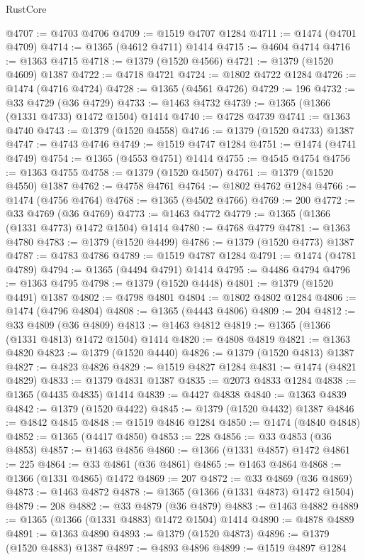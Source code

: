 \begin{lexlean}{RustCore}
\begin{coremodule}
@4707 := @4703 @4706
@4709 := @1519 @4707 @1284
@4711 := @1474 (@4701 @4709)
@4714 := @1365 (@4612 @4711) @1414
@4715 := @4604 @4714
@4716 := @1363 @4715
@4718 := @1379 (@1520 @4566)
@4721 := @1379 (@1520 @4609) @1387
@4722 := @4718 @4721
@4724 := @1802 @4722 @1284
@4726 := @1474 (@4716 @4724)
@4728 := @1365 (@4561 @4726)
@4729 := 196
@4732 := @33 @4729 (@36 @4729)
@4733 := @1463 @4732
@4739 := @1365 (@1366 (@1331 @4733) @1472 @1504) @1414
@4740 := @4728 @4739
@4741 := @1363 @4740
@4743 := @1379 (@1520 @4558)
@4746 := @1379 (@1520 @4733) @1387
@4747 := @4743 @4746
@4749 := @1519 @4747 @1284
@4751 := @1474 (@4741 @4749)
@4754 := @1365 (@4553 @4751) @1414
@4755 := @4545 @4754
@4756 := @1363 @4755
@4758 := @1379 (@1520 @4507)
@4761 := @1379 (@1520 @4550) @1387
@4762 := @4758 @4761
@4764 := @1802 @4762 @1284
@4766 := @1474 (@4756 @4764)
@4768 := @1365 (@4502 @4766)
@4769 := 200
@4772 := @33 @4769 (@36 @4769)
@4773 := @1463 @4772
@4779 := @1365 (@1366 (@1331 @4773) @1472 @1504) @1414
@4780 := @4768 @4779
@4781 := @1363 @4780
@4783 := @1379 (@1520 @4499)
@4786 := @1379 (@1520 @4773) @1387
@4787 := @4783 @4786
@4789 := @1519 @4787 @1284
@4791 := @1474 (@4781 @4789)
@4794 := @1365 (@4494 @4791) @1414
@4795 := @4486 @4794
@4796 := @1363 @4795
@4798 := @1379 (@1520 @4448)
@4801 := @1379 (@1520 @4491) @1387
@4802 := @4798 @4801
@4804 := @1802 @4802 @1284
@4806 := @1474 (@4796 @4804)
@4808 := @1365 (@4443 @4806)
@4809 := 204
@4812 := @33 @4809 (@36 @4809)
@4813 := @1463 @4812
@4819 := @1365 (@1366 (@1331 @4813) @1472 @1504) @1414
@4820 := @4808 @4819
@4821 := @1363 @4820
@4823 := @1379 (@1520 @4440)
@4826 := @1379 (@1520 @4813) @1387
@4827 := @4823 @4826
@4829 := @1519 @4827 @1284
@4831 := @1474 (@4821 @4829)
@4833 := @1379 @4831 @1387
@4835 := @2073 @4833 @1284
@4838 := @1365 (@4435 @4835) @1414
@4839 := @4427 @4838
@4840 := @1363 @4839
@4842 := @1379 (@1520 @4422)
@4845 := @1379 (@1520 @4432) @1387
@4846 := @4842 @4845
@4848 := @1519 @4846 @1284
@4850 := @1474 (@4840 @4848)
@4852 := @1365 (@4417 @4850)
@4853 := 228
@4856 := @33 @4853 (@36 @4853)
@4857 := @1463 @4856
@4860 := @1366 (@1331 @4857) @1472
@4861 := 225
@4864 := @33 @4861 (@36 @4861)
@4865 := @1463 @4864
@4868 := @1366 (@1331 @4865) @1472
@4869 := 207
@4872 := @33 @4869 (@36 @4869)
@4873 := @1463 @4872
@4878 := @1365 (@1366 (@1331 @4873) @1472 @1504)
@4879 := 208
@4882 := @33 @4879 (@36 @4879)
@4883 := @1463 @4882
@4889 := @1365 (@1366 (@1331 @4883) @1472 @1504) @1414
@4890 := @4878 @4889
@4891 := @1363 @4890
@4893 := @1379 (@1520 @4873)
@4896 := @1379 (@1520 @4883) @1387
@4897 := @4893 @4896
@4899 := @1519 @4897 @1284

\end{coremodule}
\end{lexlean}
